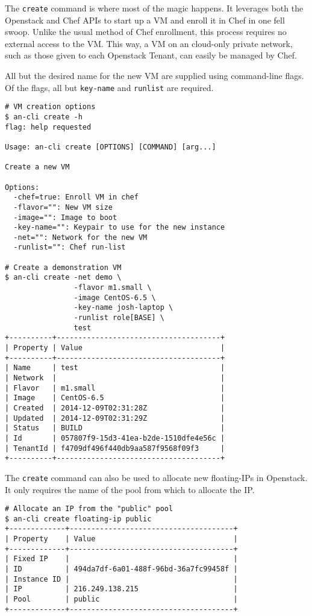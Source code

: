 \documentclass[11pt]{article}
\begin{document}
The \texttt{create} command is where most of the \aN magic happens. It
leverages both the Openstack and Chef APIs to start up a VM and enroll it in
Chef in one fell swoop. Unlike the usual method of Chef enrollment, this
process requires no external access to the VM. This way, a VM on an
cloud-only private network, such as those given to each Openstack
Tenant, can easily be managed by Chef.

All but the desired name for the new VM are supplied using command-line
flags. Of the flags, all but \texttt{key-name} and \texttt{runlist} are
required.

\begin{lstlisting}
# VM creation options
$ an-cli create -h
flag: help requested

Usage: an-cli create [OPTIONS] [COMMAND] [arg...]

Create a new VM

Options:
  -chef=true: Enroll VM in chef
  -flavor="": New VM size
  -image="": Image to boot
  -key-name="": Keypair to use for the new instance
  -net="": Network for the new VM
  -runlist="": Chef run-list

# Create a demonstration VM
$ an-cli create -net demo \
                -flavor m1.small \
                -image CentOS-6.5 \
                -key-name josh-laptop \
                -runlist role[BASE] \
                test
+----------+--------------------------------------+
| Property | Value                                |
+----------+--------------------------------------+
| Name     | test                                 |
| Network  |                                      |
| Flavor   | m1.small                             |
| Image    | CentOS-6.5                           |
| Created  | 2014-12-09T02:31:28Z                 |
| Updated  | 2014-12-09T02:31:29Z                 |
| Status   | BUILD                                |
| Id       | 057807f9-15d3-41ea-b2de-1510dfe4e56c |
| TenantId | f4709df496f440db9aa587f9568f09f3     |
+----------+--------------------------------------+
\end{lstlisting}

The \texttt{create} command can also be used to allocate new
floating-IPs in Openstack. It only requires the name of the pool from
which to allocate the IP.

\begin{lstlisting}
# Allocate an IP from the "public" pool
$ an-cli create floating-ip public
+-------------+--------------------------------------+
| Property    | Value                                |
+-------------+--------------------------------------+
| Fixed IP    |                                      |
| ID          | 494da7df-6a01-488f-96bd-36a7fc99458f |
| Instance ID |                                      |
| IP          | 216.249.138.215                      |
| Pool        | public                               |
+-------------+--------------------------------------+
\end{lstlisting}
\end{document}
